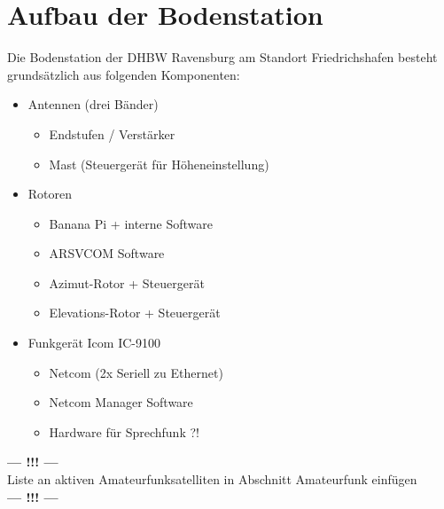 

\chapter{Aufbau der Bodenstation}
\label{chap:bodenstation}

Die Bodenstation der DHBW Ravensburg am Standort Friedrichshafen besteht grundsätzlich aus folgenden 
Komponenten:

\begin{itemize}
	\parskip0pt
	\item Antennen (drei Bänder)
	\begin{itemize}
		\item Endstufen / Verstärker
		\item Mast (Steuergerät für Höheneinstellung)
	\end{itemize}
	\item Rotoren
	\begin{itemize}
		\item Banana Pi + interne Software
		\item ARSVCOM Software
		\item Azimut-Rotor + Steuergerät
		\item Elevations-Rotor + Steuergerät
	\end{itemize}
	\item Funkgerät Icom IC-9100
	\begin{itemize}
		\item Netcom (2x Seriell zu Ethernet)
		\item Netcom Manager Software
		\item Hardware für Sprechfunk ?!
	\end{itemize}
\end{itemize}

\begin{center}
	\Large{\textbf{--- !!! ---}\\Liste an aktiven Amateurfunksatelliten in Abschnitt Amateurfunk 
einfügen\\\textbf{--- !!! ---}}
\end{center} 
